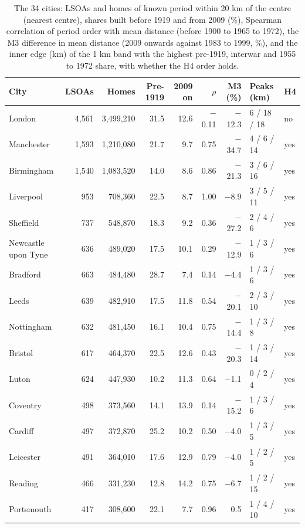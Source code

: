 \documentclass[11pt,a4paper]{article}
\begin{document}
\begin{table}[tbp]\centering\footnotesize\setlength{\tabcolsep}{4pt}\caption{The 34 cities: LSOAs and homes of known period within 20 km of the centre (nearest centre), shares built before 1919 and from 2009 (\%), Spearman correlation of period order with mean distance (before 1900 to 1965 to 1972), the M3 difference in mean distance (2009 onwards against 1983 to 1999, \%), and the inner edge (km) of the 1 km band with the highest pre-1919, interwar and 1955 to 1972 share, with whether the H4 order holds.}\label{tab:citylist}\label{tab:cities}\begin{tabular}{lrrrrrrll}\toprule City & LSOAs & Homes & Pre-1919 & 2009 on & $\rho$ & M3 (\%) & Peaks (km) & H4\\\midrule
London & 4,561 & 3,499,210 & 31.5 & 12.6 & $-$0.11 & $-$12.3 & 6 / 18 / 18 & no\\
Manchester & 1,593 & 1,210,080 & 21.7 & 9.7 & 0.75 & $-$34.7 & 4 / 6 / 14 & yes\\
Birmingham & 1,540 & 1,083,520 & 14.0 & 8.6 & 0.86 & $-$21.3 & 3 / 6 / 16 & yes\\
Liverpool & 953 & 708,360 & 22.5 & 8.7 & 1.00 & $-$8.9 & 3 / 5 / 11 & yes\\
Sheffield & 737 & 548,870 & 18.3 & 9.2 & 0.36 & $-$27.2 & 2 / 4 / 6 & yes\\
Newcastle upon Tyne & 636 & 489,020 & 17.5 & 10.1 & 0.29 & $-$12.9 & 1 / 3 / 6 & yes\\
Bradford & 663 & 484,480 & 28.7 & 7.4 & 0.14 & $-$4.4 & 1 / 3 / 6 & yes\\
Leeds & 639 & 482,910 & 17.5 & 11.8 & 0.54 & $-$20.1 & 2 / 3 / 10 & yes\\
Nottingham & 632 & 481,450 & 16.1 & 10.4 & 0.75 & $-$14.4 & 1 / 3 / 8 & yes\\
Bristol & 617 & 464,370 & 22.5 & 12.6 & 0.43 & $-$20.3 & 1 / 3 / 14 & yes\\
Luton & 624 & 447,930 & 10.2 & 11.3 & 0.64 & $-$1.1 & 0 / 2 / 4 & yes\\
Coventry & 498 & 373,560 & 14.1 & 13.9 & 0.14 & $-$15.2 & 1 / 3 / 6 & yes\\
Cardiff & 497 & 372,870 & 25.2 & 10.2 & 0.50 & $-$4.0 & 1 / 3 / 5 & yes\\
Leicester & 491 & 364,010 & 17.6 & 12.9 & 0.79 & $-$4.0 & 1 / 2 / 5 & yes\\
Reading & 466 & 331,230 & 12.8 & 14.2 & 0.75 & $-$6.7 & 1 / 2 / 15 & yes\\
Portsmouth & 417 & 308,600 & 22.1 & 7.7 & 0.96 & 0.5 & 1 / 4 / 10 & yes\\

\end{tabular}
\end{table}
\end{document}
